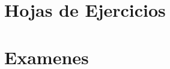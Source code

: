 \documentclass{apuntes}
\begin{document}





%



\chapter{Hojas de Ejercicios}


\chapter{Examenes}

\end{document}
